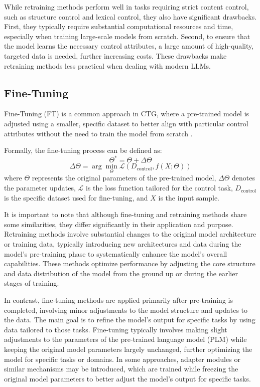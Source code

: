 \documentclass[acmsmall, screen]{acmart}
\begin{document}
While retraining methods perform well in tasks requiring strict content control, such as structure control and lexical control, they also have significant drawbacks. First, they typically require substantial computational resources and time, especially when training large-scale models from scratch. Second, to ensure that the model learns the necessary control attributes, a large amount of high-quality, targeted data is needed, further increasing costs. These drawbacks make retraining methods less practical when dealing with modern LLMs.

\subsection{Fine-Tuning}
Fine-Tuning (FT) is a common approach in CTG, where a pre-trained model is adjusted using a smaller, specific dataset to better align with particular control attributes without the need to train the model from scratch \cite{dodge_arxiv20_finetuning}.

Formally, the fine-tuning process can be defined as:
\begin{equation}
\Theta^* = \Theta + \Delta \Theta
\end{equation}
\begin{equation}
\Delta \Theta = \arg\min_{\Theta} \mathcal{L}(D_{\text{control}}, f(X; \Theta))
\end{equation}
where \( \Theta \) represents the original parameters of the pre-trained model, \( \Delta \Theta \) denotes the parameter updates, \( \mathcal{L} \) is the loss function tailored for the control task, \( D_{\text{control}} \) is the specific dataset used for fine-tuning, and \( X \) is the input sample.



It is important to note that although fine-tuning and retraining methods share some similarities, they differ significantly in their application and purpose. Retraining methods involve substantial changes to the original model architecture or training data, typically introducing new architectures and data during the model's pre-training phase to systematically enhance the model's overall capabilities. These methods optimize performance by adjusting the core structure and data distribution of the model from the ground up or during the earlier stages of training.

In contrast, fine-tuning methods are applied primarily after pre-training is completed, involving minor adjustments to the model structure and updates to the data. The main goal is to refine the model's output for specific tasks by using data tailored to those tasks. Fine-tuning typically involves making slight adjustments to the parameters of the pre-trained language model (PLM) while keeping the original model parameters largely unchanged, further optimizing the model for specific tasks or domains. In some approaches, adapter modules or similar mechanisms \cite{houlsby_plmr19_adapter} may be introduced, which are trained while freezing the original model parameters to better adjust the model's output for specific tasks.
\end{document}
